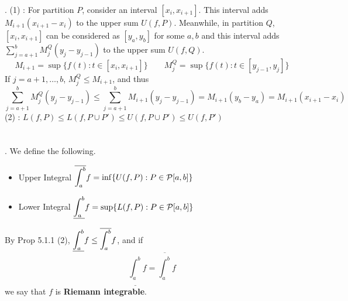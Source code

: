 \pf. (1) : For partition $P$, consider an interval $[x_{i}, x_{i+1}]$. This interval adds $M_{i+1}(x_{i+1}-x_i)$ to the upper sum $U(f, P)$. Meanwhile, in partition $Q$, $[x_i, x_{i+1}]$ can be considered as $[y_a, y_b]$ for some $a, b$ and this interval adds $\sum_{j=a+1}^b M_{j}^Q(y_{j}-y_{j-1})$ to the upper sum $U(f, Q)$.\\
$$M_{i+1} =\sup\{f(t): t\in [x_i, x_{i+1}]\} \qquad M_{j}^Q = \sup\{f(t): t\in [y_{j-1}, y_j] \}$$
If $j = a+1, \dots, b$, $M_{j}^Q\leq M_{i+1}$, and thus
$$
	\sum_{j=a+1}^b M_j^Q (y_j-y_{j-1}) \leq \sum_{j=a+1}^b M_{i+1}(y_j - y_{j-1}) = M_{i+1}(y_b-y_a) = M_{i+1}(x_{i+1}-x_i)
$$
(2) : $L(f, P)\leq L(f, P\cup P') \leq U(f, P\cup P') \leq U(f, P')$\\
\\
\\
. We define the following.
\begin{itemize}
	\item Upper Integral $\displaystyle \overline{\int_a^b} f = \inf\{U(f, P): P\in \mathcal{P}[a, b] \}$
	\item Lower Integral $\displaystyle \underline{\int_a^b} f = \sup\{L(f, P): P\in \mathcal{P}[a, b] \}$
\end{itemize}
By Prop 5.1.1 (2), $\displaystyle \underline{\int_a^b} f \leq \overline{\int_a^b} f$, and if $$\underline{\int_a^b}f = \overline{\int_a^b}f$$
we say that $f$ is \textbf{Riemann integrable}.
\pagebreak